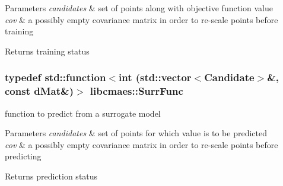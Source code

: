 \begin{DoxyParams}{Parameters}
{\em candidates} & set of points along with objective function value \\
\hline
{\em cov} & a possibly empty covariance matrix in order to re-\/scale points before training \\
\hline
\end{DoxyParams}
\begin{DoxyReturn}{Returns}
training status 
\end{DoxyReturn}
\hypertarget{namespacelibcmaes_a7115c4ca01f7e080f5c39c076242bf00}{
\subsubsection[{Surr\-Func}]{\setlength{\rightskip}{0pt plus 5cm}typedef std\-::function$<$int (std\-::vector$<${\bf Candidate}$>$\&, const d\-Mat\&)$>$ {\bf libcmaes\-::\-Surr\-Func}}}\label{namespacelibcmaes_a7115c4ca01f7e080f5c39c076242bf00}


function to predict from a surrogate model 


\begin{DoxyParams}{Parameters}
{\em candidates} & set of points for which value is to be predicted \\
\hline
{\em cov} & a possibly empty covariance matrix in order to re-\/scale points before predicting \\
\hline
\end{DoxyParams}
\begin{DoxyReturn}{Returns}
prediction status 
\end{DoxyReturn}
